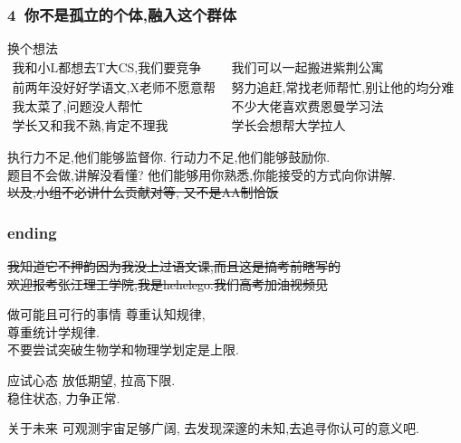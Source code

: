 \documentclass[10pt]{beamer}
\begin{document}
\begin{frame}
	\frametitle{4\ 你不是孤立的个体,融入这个群体}

	\begin{block}{换个想法}
		\[ \begin{array}{ll}
			\text{我和小L都想去T大CS,我们要竞争}& \text{我们可以一起搬进紫荆公寓}\\
			\text{前两年没好好学语文,X老师不愿意帮我} & \text{努力追赶,常找老师帮忙,别让他的均分难看}\\
			\text{我太菜了,问题没人帮忙} & \text{不少大佬喜欢费恩曼学习法}\\
			\text{学长又和我不熟,肯定不理我} &\text{学长会想帮大学拉人}
		\end{array} \]
	\end{block}


	执行力不足,他们能够监督你. 行动力不足,他们能够鼓励你.\\
	题目不会做,讲解没看懂? 他们能够用你熟悉,你能接受的方式向你讲解.\\
	\vspace{1em}
	\sout{以及,小组不必讲什么贡献对等, 又不是AA制恰饭}
\end{frame}

\begin{frame}
	\frametitle{ending}

	\sout{我知道它不押韵因为我没上过语文课,而且这是搞考前瞎写的}\\
	\sout{欢迎报考张江理工学院,我是hehelego.我们高考加油视频见}\\

	\begin{block}{做可能且可行的事情}
		尊重认知规律,\\
		尊重统计学规律.\\
		不要尝试突破生物学和物理学划定是上限.
	\end{block}

	\begin{block}{应试心态}
		放低期望, 拉高下限.\\
		稳住状态, 力争正常.
	\end{block}

	\begin{block}{关于未来}
		可观测宇宙足够广阔, 去发现深邃的未知,去追寻你认可的意义吧.
	\end{block}
\end{frame}
\end{document}
